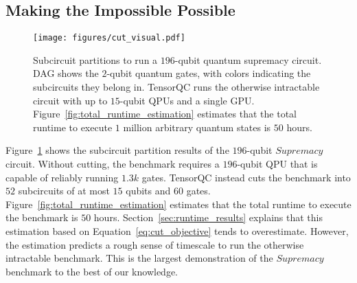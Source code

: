 \subsection{Making the Impossible Possible}
\begin{figure}[t]
    \centering
    \texttt{[image: figures/cut\_visual.pdf]}
    \caption{Subcircuit partitions to run a $196$-qubit quantum supremacy circuit.
    DAG shows the $2$-qubit quantum gates, with colors indicating the subcircuits they belong in.
    TensorQC runs the otherwise intractable circuit with up to $15$-qubit QPUs and a single GPU.
    Figure~\ref{fig:total_runtime_estimation} estimates that the total runtime to execute $1$ million arbitrary quantum states is $50$ hours.}
    \label{fig:supremacy_highlight}
\end{figure}

Figure~\ref{fig:supremacy_highlight} shows the subcircuit partition results of the $196$-qubit $Supremacy$ circuit.
Without cutting, the benchmark requires a $196$-qubit QPU that is capable of reliably running $1.3k$ gates.
TensorQC instead cuts the benchmark into $52$ subcircuits of at most $15$ qubits and $60$ gates.
Figure~\ref{fig:total_runtime_estimation} estimates that the total runtime to execute the benchmark is $50$ hours.
Section~\ref{sec:runtime_results} explains that this estimation based on Equation~\ref{eq:cut_objective} tends to overestimate.
However, the estimation predicts a rough sense of timescale to run the otherwise intractable benchmark.
This is the largest demonstration of the $Supremacy$ benchmark to the best of our knowledge.